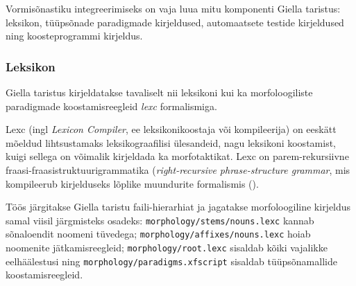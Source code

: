 \documentclass[12pt,a4paper]{article}
\begin{document}
Vormisõnastiku integreerimiseks on vaja luua mitu komponenti Giella taristus: leksikon, tüüpsõnade paradigmade kirjeldused, automaatsete testide kirjeldused ning kooste\-programmi kirjeldus. 





\subsubsection{Leksikon}
\label{sec:giella-leksikon}


Giella taristus kirjeldatakse tavaliselt nii leksikoni kui ka morfoloogiliste paradigmade koostamis\-reegleid \textit{lexc} formalismiga.

Lexc (ingl \textit{Lexicon Compiler}, ee leksikoni\-koostaja või kompileerija) on eeskätt mõeldud lihtsustamaks leksikograafilisi ülesandeid, nagu leksikoni koostamist, kuigi sellega on võimalik kirjeldada ka morfotaktikat. 
Lexc on parem-rekursiivne fraasi-fraasi\-struktuuri\-grammatika (\textit{right-recursive phrase-structure grammar}, mis kompileerub kirjelduseks lõplike muundurite formalismis (\cites[]{karttunen_finite-state_1993}[203]{beesley_finite_2003}). 

Töös järgitakse Giella taristu faili-hierarhiat ja jagatakse morfoloogiline kirjeldus samal viisil järgmisteks osadeks: \texttt{morphology/stems/nouns.lexc} kannab sõna\-loendit noomeni tüvedega; \texttt{morphology/affixes/nouns.lexc} hoiab noomenite jätkamis\-reegleid; \texttt{morphology/root.lexc} sisaldab kõiki vajalikke eel\-häälestusi ning \texttt{morphology/paradigms.xfscript} sisaldab tüüpsõna\-mallide koostamis\-reegleid.
\end{document}
